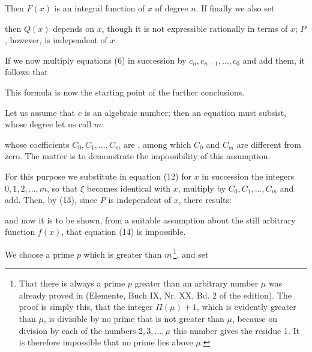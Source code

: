 Then $F(x)$ is an integral function of $x$ of degree $n$. If finally we also set



then $Q(x)$ depends on $x$, though it is not expressible rationally in terms of $x$; $P$, however, is independent of $x$.

If we now multiply equations (6) in succession by $c_n, c_{n-1},\ldots, c_0$ and add them, it follows that


This formula is now the starting point of the further conclusions.

Let us assume that $e$ is an algebraic number; then an equation must subsist, whose degree let us call $m$:


whose coefficients $C_0, C_1, \ldots, C_m$ are , among which $C_0$ and $C_m$ are different from zero. The matter is to demonstrate the impossibility of this assumption.

For this purpose we substitute in equation (12) for $x$ in succession the integers $0,1,2,\ldots,m$, so that $\xi$ becomes identical with $x$, multiply by $C_0, C_1, \ldots, C_m$ and add. Then, by (13), since $P$ is independent of $x$, there results:


and now it is to be shown, from a suitable assumption about the still arbitrary function $f(x)$, that equation (14) is impossible.

We choose a prime $p$ which is greater than $m$\,\footnote{That there is always a prime $p$ greater than an arbitrary number $\mu$ was already proved in  (Elemente, Buch IX, Nr. XX, Bd. 2 of the  edition). The proof is simply this, that the integer $\Pi(\mu)+1$, which is evidently greater than $\mu$, is divisible by no prime that is not greater than $\mu$, because on division by each of the numbers $2,3,\ldots,\mu$ this number gives the residue 1. It is therefore impossible that no prime lies above $\mu$.}, and set


